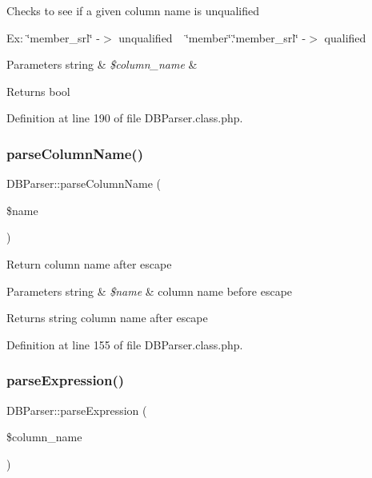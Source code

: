 Checks to see if a given column name is unqualified

Ex\+: \char`\"{}member\+\_\+srl\char`\"{} -\/$>$ unqualified ~\newline
 \char`\"{}member\char`\"{}.\char`\"{}member\+\_\+srl\char`\"{} -\/$>$ qualified


\begin{DoxyParams}[1]{Parameters}
string & {\em \$column\+\_\+name} & \\
\hline
\end{DoxyParams}
\begin{DoxyReturn}{Returns}
bool 
\end{DoxyReturn}


Definition at line 190 of file D\+B\+Parser.\+class.\+php.

\mbox{\label{classDBParser_a4e9d7229c290a48fddd26c278f964dab}} 
\subsubsection{\texorpdfstring{parse\+Column\+Name()}{parseColumnName()}}
{\footnotesize\ttfamily D\+B\+Parser\+::parse\+Column\+Name (\begin{DoxyParamCaption}\item[{}]{\$name }\end{DoxyParamCaption})}

Return column name after escape


\begin{DoxyParams}[1]{Parameters}
string & {\em \$name} & column name before escape\\
\hline
\end{DoxyParams}
\begin{DoxyReturn}{Returns}
string column name after escape 
\end{DoxyReturn}


Definition at line 155 of file D\+B\+Parser.\+class.\+php.

\mbox{\label{classDBParser_a44e806ac029512b9d54b2f44a0a6385f}} 
\subsubsection{\texorpdfstring{parse\+Expression()}{parseExpression()}}
{\footnotesize\ttfamily D\+B\+Parser\+::parse\+Expression (\begin{DoxyParamCaption}\item[{}]{\$column\+\_\+name }\end{DoxyParamCaption})}

